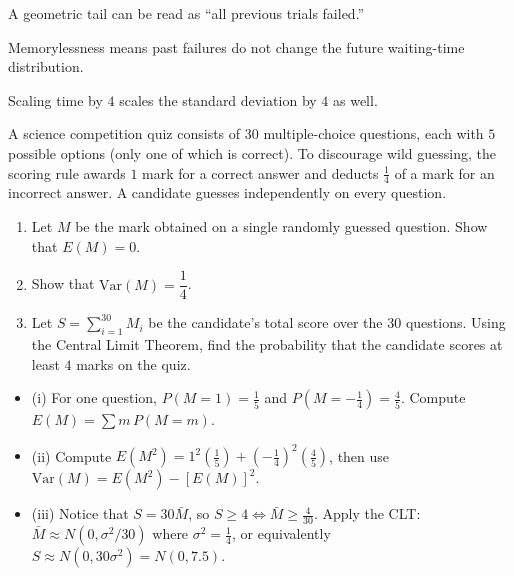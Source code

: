 \begin{takeaways}
\item A geometric tail can be read as ``all previous trials failed.''
\item Memorylessness means past failures do not change the future waiting-time distribution.
\item Scaling time by $4$ scales the standard deviation by $4$ as well.
\end{takeaways}

\begin{problem}
A science competition quiz consists of $30$ multiple-choice questions, each with $5$ possible options (only one of which is correct). To discourage wild guessing, the scoring rule awards $1$ mark for a correct answer and deducts $\frac{1}{4}$ of a mark for an incorrect answer. A candidate guesses independently on every question.
\begin{enumerate}[label=\textbf{(\roman*)}]
  \item Let $M$ be the mark obtained on a single randomly guessed question. Show that $E(M) = 0$.
  \item Show that $\mathrm{Var}(M) = \dfrac{1}{4}$.
  \item Let $S = \sum_{i=1}^{30} M_i$ be the candidate's total score over the $30$ questions. Using the Central Limit Theorem, find the probability that the candidate scores at least $4$ marks on the quiz.
\end{enumerate}
\end{problem}

\begin{hint}
\begin{itemize}[leftmargin=*]
  \item (i) For one question, $P(M=1) = \frac{1}{5}$ and $P(M=-\frac{1}{4}) = \frac{4}{5}$. Compute $E(M) = \sum m\,P(M=m)$.
  \item (ii) Compute $E(M^2) = 1^2(\frac{1}{5}) + (-\frac{1}{4})^2(\frac{4}{5})$, then use $\mathrm{Var}(M) = E(M^2) - [E(M)]^2$.
  \item (iii) Notice that $S = 30\bar{M}$, so $S \geq 4 \iff \bar{M} \geq \frac{4}{30}$. Apply the CLT: $\bar{M} \approx N(0, \sigma^2/30)$ where $\sigma^2 = \frac{1}{4}$, or equivalently $S \approx N(0, 30\sigma^2) = N(0, 7{.}5)$.
\end{itemize}
\end{hint}

